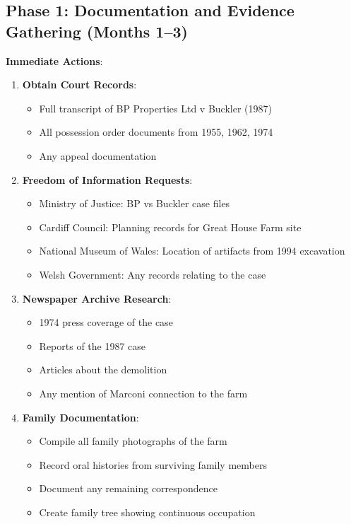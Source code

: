 \documentclass[11pt,a4paper]{article}
\begin{document}
\subsection{Phase 1: Documentation and Evidence Gathering (Months 1--3)}

\begin{action}
\textbf{Immediate Actions}:
\begin{enumerate}[label=\arabic*.]
    \item \textbf{Obtain Court Records}:
    \begin{itemize}
        \item Full transcript of BP Properties Ltd v Buckler (1987)
        \item All possession order documents from 1955, 1962, 1974
        \item Any appeal documentation
    \end{itemize}
    
    \item \textbf{Freedom of Information Requests}:
    \begin{itemize}
        \item Ministry of Justice: BP vs Buckler case files
        \item Cardiff Council: Planning records for Great House Farm site
        \item National Museum of Wales: Location of artifacts from 1994 excavation
        \item Welsh Government: Any records relating to the case
    \end{itemize}
    
    \item \textbf{Newspaper Archive Research}:
    \begin{itemize}
        \item 1974 press coverage of the case
        \item Reports of the 1987 case
        \item Articles about the demolition
        \item Any mention of Marconi connection to the farm
    \end{itemize}
    
    \item \textbf{Family Documentation}:
    \begin{itemize}
        \item Compile all family photographs of the farm
        \item Record oral histories from surviving family members
        \item Document any remaining correspondence
        \item Create family tree showing continuous occupation
    \end{itemize}
\end{enumerate}
\end{action}
\end{document}
